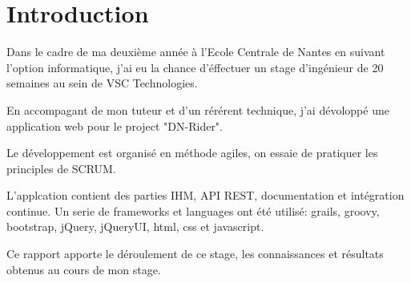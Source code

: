 \chapter{Introduction}
\label{chap:Introduction}

Dans le cadre de ma deuxième année à l'Ecole Centrale de Nantes en suivant l'option informatique,
j'ai eu la chance d'éffectuer un stage d'ingénieur de 20 semaines au sein de VSC Technologies.

En accompagant de mon tuteur et d'un rérérent technique, j'ai dévoloppé une application web pour le project "DN-Rider".

Le développement est organisé en méthode agiles, on essaie de pratiquer les principles de SCRUM.

L'applcation contient des parties IHM, API REST, documentation et intégration continue.
Un serie de frameworks et languages ont été utilisé: grails, groovy, bootstrap, jQuery, jQueryUI, html, css et javascript.

Ce rapport apporte le déroulement de ce stage, les connaissances et résultats obtenus au cours de mon stage.
